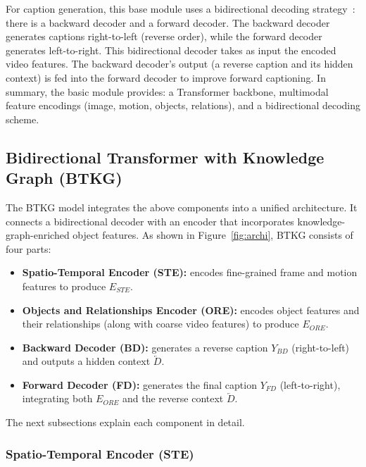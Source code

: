For caption generation, this base module uses a bidirectional decoding strategy~\cite{BiTransformer}: there is a backward decoder and a forward decoder. The backward decoder generates captions right-to-left (reverse order), while the forward decoder generates left-to-right. This bidirectional decoder takes as input the encoded video features. The backward decoder's output (a reverse caption and its hidden context) is fed into the forward decoder to improve forward captioning. In summary, the basic module provides: a Transformer backbone, multimodal feature encodings (image, motion, objects, relations), and a bidirectional decoding scheme.

\subsection{Bidirectional Transformer with Knowledge Graph (BTKG)}

The BTKG model integrates the above components into a unified architecture. It connects a bidirectional decoder with an encoder that incorporates knowledge-graph-enriched object features. As shown in Figure~\ref{fig:archi}, BTKG consists of four parts:

\begin{itemize}
    \item \textbf{Spatio-Temporal Encoder (STE):} encodes fine-grained frame and motion features to produce $E_{STE}$.
    
    \item \textbf{Objects and Relationships Encoder (ORE):} encodes object features and their relationships (along with coarse video features) to produce $E_{ORE}$.
    
    \item \textbf{Backward Decoder (BD):} generates a reverse caption $Y_{BD}$ (right-to-left) and outputs a hidden context $\overleftarrow{D}$.
    
    \item \textbf{Forward Decoder (FD):} generates the final caption $Y_{FD}$ (left-to-right), integrating both $E_{ORE}$ and the reverse context $\overleftarrow{D}$.
\end{itemize}

The next subsections explain each component in detail.

\subsubsection{Spatio-Temporal Encoder (STE)}

